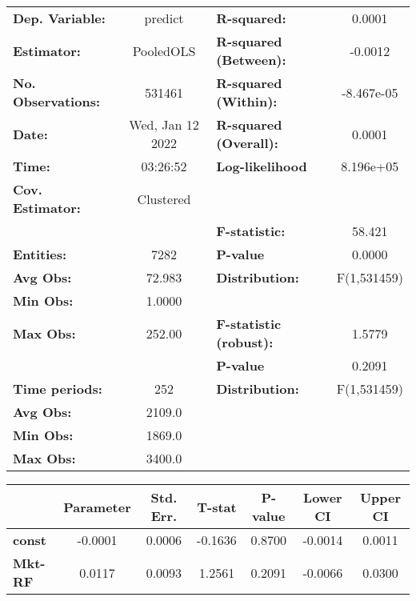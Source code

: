 \begin{center}
\begin{tabular}{lclc}
\toprule
\textbf{Dep. Variable:}    &      predict       & \textbf{  R-squared:         }   &      0.0001      \\
\textbf{Estimator:}        &     PooledOLS      & \textbf{  R-squared (Between):}  &     -0.0012      \\
\textbf{No. Observations:} &       531461       & \textbf{  R-squared (Within):}   &    -8.467e-05    \\
\textbf{Date:}             &  Wed, Jan 12 2022  & \textbf{  R-squared (Overall):}  &      0.0001      \\
\textbf{Time:}             &      03:26:52      & \textbf{  Log-likelihood     }   &    8.196e+05     \\
\textbf{Cov. Estimator:}   &     Clustered      & \textbf{                     }   &                  \\
\textbf{}                  &                    & \textbf{  F-statistic:       }   &      58.421      \\
\textbf{Entities:}         &        7282        & \textbf{  P-value            }   &      0.0000      \\
\textbf{Avg Obs:}          &       72.983       & \textbf{  Distribution:      }   &   F(1,531459)    \\
\textbf{Min Obs:}          &       1.0000       & \textbf{                     }   &                  \\
\textbf{Max Obs:}          &       252.00       & \textbf{  F-statistic (robust):} &      1.5779      \\
\textbf{}                  &                    & \textbf{  P-value            }   &      0.2091      \\
\textbf{Time periods:}     &        252         & \textbf{  Distribution:      }   &   F(1,531459)    \\
\textbf{Avg Obs:}          &       2109.0       & \textbf{                     }   &                  \\
\textbf{Min Obs:}          &       1869.0       & \textbf{                     }   &                  \\
\textbf{Max Obs:}          &       3400.0       & \textbf{                     }   &                  \\
\bottomrule
\end{tabular}
\begin{tabular}{lcccccc}
                & \textbf{Parameter} & \textbf{Std. Err.} & \textbf{T-stat} & \textbf{P-value} & \textbf{Lower CI} & \textbf{Upper CI}  \\
\midrule
\textbf{const}  &      -0.0001       &       0.0006       &     -0.1636     &      0.8700      &      -0.0014      &       0.0011       \\
\textbf{Mkt-RF} &       0.0117       &       0.0093       &      1.2561     &      0.2091      &      -0.0066      &       0.0300       \\
\bottomrule
\end{tabular}
\end{center}
